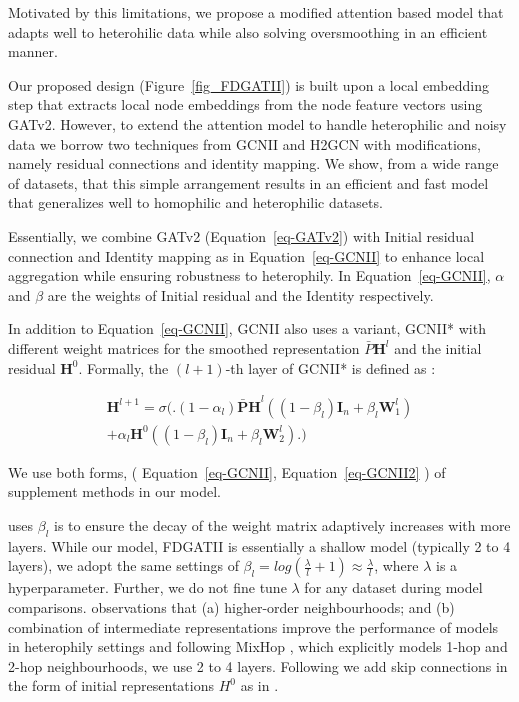 \documentclass{article}
\begin{document}
Motivated by this limitations, we propose a modified attention based model that adapts well to heterohilic data while also solving oversmoothing in an efficient manner. 

Our proposed design (Figure~\ref{fig_FDGATII}) is built upon a local embedding step that extracts local node embeddings from the node feature vectors using GATv2. However, to extend the attention model to handle heterophilic and noisy data we borrow two techniques from GCNII \cite{chen2020simple} and H2GCN \cite{zhu2020beyond} with modifications, namely residual connections and identity mapping. We show, from a wide range of datasets, that this simple arrangement results in an efficient and fast model that generalizes well to homophilic and heterophilic datasets. 

Essentially, we combine GATv2 (Equation~\ref{eq-GATv2}) with Initial residual connection and Identity mapping as in Equation~\ref{eq-GCNII} to enhance local aggregation while ensuring robustness to heterophily. In Equation~\ref{eq-GCNII}, $\alpha$ and $\beta$ are the weights of Initial residual and the Identity respectively.

In addition to Equation~\ref{eq-GCNII}, GCNII also uses a variant, GCNII* with different weight matrices for the smoothed representation $\bar{P}\mathbf{H}^l$ and the initial residual $\mathbf{H}^{0}$. Formally, the $(l+1)$-th layer of GCNII* is defined as : 

\begin{equation}
\begin{split}
\mathbf{H}^{l+1} = \sigma\Bigg(\Bigg. \left(1-\alpha_l\right)\mathbf{\bar{P}H}^l\left(\left(1-\beta_l\right)\mathbf{I}_{n}+\beta_l\mathbf{W}_{1}^l\right) \\ 
+ \alpha_l\mathbf{H}^{0}\left(\left(1-\beta_l\right)\mathbf{I}_{n}+\beta_l\mathbf{W}_{2}^l\right) \Bigg.\Bigg)
\end{split}
\label{eq-GCNII2}
\end{equation}

We use both forms, ( Equation~\ref{eq-GCNII}, Equation~\ref{eq-GCNII2} ) of  supplement methods in our model.

\citet{chen2020simple} uses $\beta_l$ is to ensure the decay of the weight matrix adaptively increases with more layers. While our model, FDGATII is essentially a shallow model (typically 2 to 4 layers), we adopt the same settings of $\beta_l = log\left(\frac{\lambda }{l}+1\right)\approx\frac{\lambda }{l}$, where $\lambda$ is a hyperparameter. Further, we do not fine tune $\lambda$ for any dataset during model comparisons. \citet{zhu2020beyond} observations that (a) higher-order neighbourhoods; and (b) combination of intermediate representations improve the performance of models in heterophily settings and following MixHop \cite{abu2019mixhop}, which explicitly models 1-hop and 2-hop neighbourhoods, we use 2 to 4 layers. Following \citet{xu2018representation} we add skip connections in the form of initial representations $H^0$ as in \citet{chen2020simple}.
\end{document}
